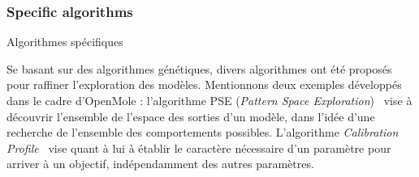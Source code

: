 \subsubsection*{Specific algorithms}{Algorithmes spécifiques}

Se basant sur des algorithmes génétiques, divers algorithmes ont été proposés pour raffiner l'exploration des modèles. Mentionnons deux exemples développés dans le cadre d'OpenMole : l'algorithme PSE (\emph{Pattern Space Exploration})~\cite{10.1371/journal.pone.0138212} vise à découvrir l'ensemble de l'espace des sorties d'un modèle, dans l'idée d'une recherche de l'ensemble des comportements possibles. L'algorithme \emph{Calibration Profile}~\cite{reuillon2015} vise quant à lui à établir le caractère nécessaire d'un paramètre pour arriver à un objectif, indépendamment des autres paramètres.





\stars






